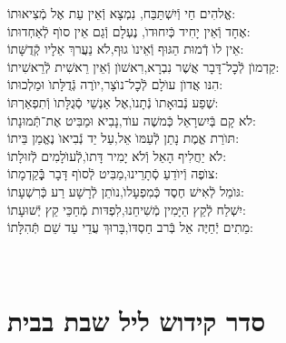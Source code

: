 \documentclass[twoside, openany, parskip=half, 11pt]{book}
\begin{document}
אֱלהִים חַי וְֿיִשְׁתַּבַּח, \hfill נִמְצָא וְֿאֵין עֵת אֶל מְֿצִיאוּתוֹ: \\
אֶחָד וְֿאֵין יָחִיד כְּֿיִחוּדוׂ, \hfill נֶעְלָם וְֿגַם אֵין סוׂף לְֿאַחְדוּתוֹ: \\
אֵין לוׂ דְֿמוּת הַגּוּף וְֿאֵינוׂ גוּף,\hfill לׂא נַעֲרךְ אֵלָיו קְֿדֻשָּׁתוֹ: \\
קַדְמוׂן לְֿכׇל־דָּבָר אֲשֶׁר נִבְרָא,\hfill רִאשׁוׂן וְֿאֵין רֵאשִׁית לְֿרֵאשִׁיתוֹ: \\
הִנּו אֲדוׂן עוׂלָם לְֿכׇל־נוׂצָר,\hfill יוׂרֶה גְֿדֻלָּתוׂ וּמַלְכוּתוֹ: \\
שֶׁפַע נְֿבוּאָתוׂ נְֿתָנוׂ,\hfill אֶל אַנְשֵׁי סְֿגֻלָּתוׂ וְֿתִפְאַרְתּוֹ: \\
לׂא קָם בְּֿיִשרָאֵל כְּֿמשֶׁה עוׂד,\hfill נָבִיא וּמַבִּיט אֶת־תְּֿמוּנָתוֹ: \\
תּוׂרַת אֱמֶת נָתַן לְֿעַמּוׂ אֵל,\hfill עַל יַד נְֿבִיאוׂ נֶאֱמַן בֵּיתוֹ: \\
לׂא יַחֲלִיף הָאֵל וְֿלׂא יָמִיר דָּתוׂ,\hfill לְֿעוׂלָמִים לְֿזוּלָתוֹ: \\
צוׂפֶה וְֿיוׂדֵעַ סְֿתָרֵינוּ,\hfill מַבִּיט לְֿסוׂף דָּבָר בְְַּֿֿקַדְמָתוֹ: \\
גּוׂמֵל לְֿאִישׁ חֶסֶד כְּֿמִפְעָלוׂ,\hfill נוׂתֵן לְֿרָשָׁע רַע כְּֿרִשְׁעָתוֹ: \\
יִשְׁלַח לְֿקֵץ הַיָּמִין מְֿשִׁיחֵנוּ,\hfill לִפְדּות מְֿחַכֵּי קֵץ יְֿשׁוּעָתוֹ: \\
מֵתִים יְֿחַיֶּה אֵל בְּֿרב חַסְדּוׂ,\hfill בָּרוּךְ עֲדֵי עַד שֵׁם תְּֿהִלָּתוֹ:\\

\vfill

\quad{}\quad{}\\

\chapter[קידוש ליל שבת]{ סדר קידוש ליל שבת בבית }



\medskip

\newcommand{\birkashabonim}{
\ssubsection{\adforn{18} ברכת הבנים \adforn{17}}

\source{בראשית מח} \begin{tabular}{>{\centering\arraybackslash}m{.4\textwidth} | >{\centering\arraybackslash}m{.4\textwidth}}
\instruction{לבנים} & \instruction{לבנות} \\
יְֿשִֽׂמְֿךָ֣ אֱלֹהִ֔ים כְּֿאֶפְרַ֖יִם וְֿכִמְנַשֶׁ֑ה &
יְֿשִׂמֵךְ אֱלׂהִים כְּֿשָׂרָה, רִבְקָה, רָחֵל, וְֿלֵאָה
\end{tabular}


יְֿבָֽרֶכְֿךָ֥
\source{במידבר ו}
יְיָ֖ וְֿיִשְׁמְֿרֶֽךָ׃\\
יָאֵ֨ר יְיָ֧ פָּנָ֛יו אֵלֶ֖יךָ וִֽיחֻנֶּֽךָּ׃\\
יִשָּׂ֨א יְיָ֤ פָּנָיו֙ אֵלֶ֔יךָ וְֿיָשֵׂ֥ם לְֿךָ֖ שָׁלֽוֹם׃


}
\end{document}
